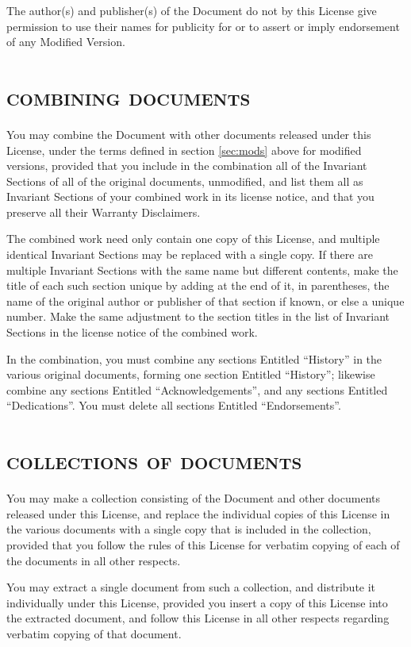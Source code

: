 The author(s) and publisher(s) of the Document do not by this License give
permission to use their names for publicity for or to assert or imply
endorsement of any Modified Version.


\section[Combining documents]{\scshape combining documents}

You may combine the Document with other documents released under this
License, under the terms defined in section \ref{sec:mods} above for
modified versions, provided that you include in the combination all of the
Invariant Sections of all of the original documents, unmodified, and list
them all as Invariant Sections of your combined work in its license notice,
and that you preserve all their Warranty Disclaimers.

The combined work need only contain one copy of this License, and multiple
identical Invariant Sections may be replaced with a single copy. If there
are multiple Invariant Sections with the same name but different contents,
make the title of each such section unique by adding at the end of it, in
parentheses, the name of the original author or publisher of that section
if known, or else a unique number. Make the same adjustment to the section
titles in the list of Invariant Sections in the license notice of the
combined work.

In the combination, you must combine any sections Entitled ``History'' in
the various original documents, forming one section Entitled ``History'';
likewise combine any sections Entitled ``Acknowledgements'', and any
sections Entitled ``Dedications''. You must delete all sections Entitled
``Endorsements''.


\section[Collections of documents]{\scshape collections of documents}

You may make a collection consisting of the Document and other documents
released under this License, and replace the individual copies of this
License in the various documents with a single copy that is included in the
collection, provided that you follow the rules of this License for verbatim
copying of each of the documents in all other respects.

You may extract a single document from such a collection, and distribute it
individually under this License, provided you insert a copy of this License
into the extracted document, and follow this License in all other respects
regarding verbatim copying of that document.


